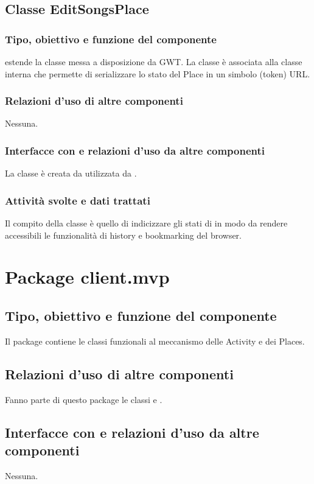 \subsection{Classe EditSongsPlace}
\subsubsection*{Tipo, obiettivo e funzione del componente}
 estende la classe  messa a disposizione da GWT. La
classe \`e associata alla classe interna  che permette di
serializzare lo stato del Place in un simbolo (token) URL.
\subsubsection*{Relazioni d'uso di altre componenti}
Nessuna.
\subsubsection*{Interfacce con e relazioni d'uso da altre componenti}
La classe \`e creata da  utilizzata da .
\subsubsection*{Attivit\`a svolte e dati trattati}
Il compito della classe \`e quello di indicizzare gli stati di
 in modo da rendere accessibili le funzionalit\`a di
history e bookmarking del browser.

\newpage
\section{Package client.mvp} %
\subsection*{Tipo, obiettivo e funzione del componente}
Il package contiene le classi funzionali al meccanismo delle Activity e dei
Places.
\subsection*{Relazioni d'uso di altre componenti}
Fanno parte di questo package le classi  e
.
\subsection*{Interfacce con e relazioni d'uso da altre componenti}
Nessuna.
